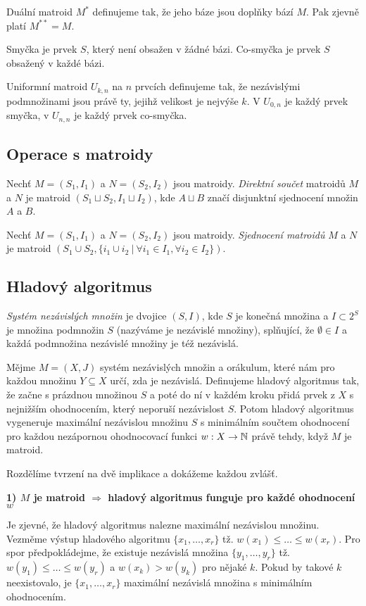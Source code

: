 \df Duální matroid $M^*$ definujeme tak, že jeho báze jsou doplňky bází $M$.
Pak zjevně platí $M^{**} = M$.

\df Smyčka je prvek $S$, který není obsažen v žádné bázi. Co-smyčka je prvek
$S$ obsažený v každé bázi.

\df Uniformní matroid $U_{k,n}$ na $n$ prvcích definujeme tak, že nezávislými
podmnožinami jsou právě ty, jejihž velikost je nejvýše $k$. V $U_{0,n}$ je
každý prvek smyčka, v $U_{n,n}$ je každý prvek co-smyčka.

\subsection{Operace s matroidy}
\df Nechť $M = (S_1,I_1)$ a $N = (S_2,I_2)$ jsou matroidy. \emph{Direktní
součet} matroidů $M$ a $N$ je matroid $(S_1 \sqcup S_2, I_1 \sqcup I_2)$, kde
$A\sqcup B$ značí disjunktní sjednocení množin $A$ a $B$.

\df Nechť $M = (S_1,I_1)$ a $N = (S_2,I_2)$ jsou matroidy. \emph{Sjednocení
matroidů} $M$ a $N$ je matroid $(S_1\cup S_2, \{i_1\cup i_2 ~|~ \forall i_1\in
I_1, \forall i_2\in I_2\})$.

\subsection{Hladový algoritmus}
\df \emph{Systém nezávislých množin} je dvojice $(S,I)$, kde $S$ je konečná
množina a $I \subset 2^S$ je množina podmnožin $S$ (nazýváme je nezávislé
množiny), splňující, že $\emptyset\in I$ a každá podmnožina nezávislé množiny
je též nezávislá.

\vt Mějme $M = (X,J)$ systém nezávislých množin a orákulum, které nám pro každou
množinu $Y\subseteq X$ určí, zda je nezávislá. Definujeme hladový algoritmus
tak, že začne s prázdnou množinou $S$ a poté do ní v každém kroku přidá prvek z
$X$ s nejnižším ohodnocením, který neporuší nezávislost $S$. Potom hladový
algoritmus vygeneruje maximální nezávislou množinu $S$ s minimálním součtem
ohodnocení pro každou nezápornou ohodnocovací funkci $w: X \rightarrow \mathbb{N}$ právě
tehdy, když $M$ je matroid.

\dk Rozdělíme tvrzení na dvě implikace a dokážeme každou zvlášť.

\noindent \textbf{1) $M$ je matroid $\Rightarrow$ hladový algoritmus funguje pro
každé ohodnocení $w$}

Je zjevné, že hladový algoritmus nalezne maximální nezávislou množinu. Vezměme
výstup hladového algoritmu $\{x_1,\dots,x_r\}$ tž. $w(x_1) \le \dots \le
w(x_r)$. Pro spor předpokládejme, že existuje nezávislá množina
$\{y_1,\dots,y_r\}$ tž. $w(y_1) \le \dots \le w(y_r)$ a $w(x_k) > w(y_k)$
pro nějaké $k$. Pokud by takové $k$ neexistovalo, je $\{x_1,\dots,x_r\}$
maximální nezávislá množina s minimálním ohodnocením.

